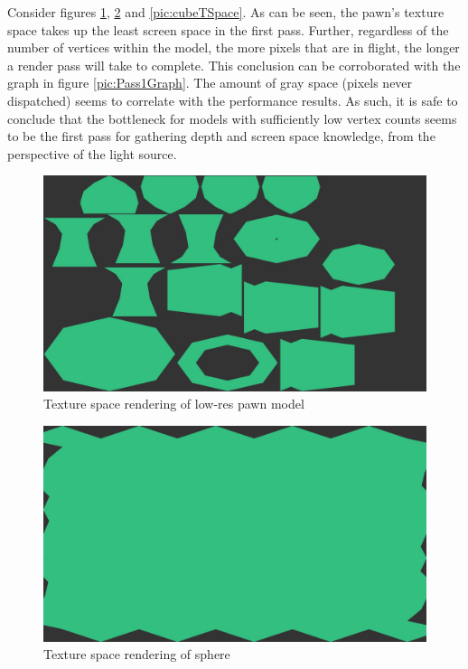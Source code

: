 \documentclass[a4paper, 12pt]{article}
\begin{document}
\noindent   Consider figures \ref{pic:pawnSpace}, \ref{pic:sphereSpace} and
\ref{pic:cubeTSpace}. As can be seen, the pawn's texture space takes up the
least screen space in the first pass. Further, regardless of the number of
vertices within the model, the more pixels that are in flight, the longer a
render pass will take to complete. This conclusion can be corroborated with
the graph in figure \ref{pic:Pass1Graph}. The amount of gray space (pixels
never dispatched) seems to correlate with the performance results. As such, it
is safe to conclude that the bottleneck for models with sufficiently low
vertex counts seems to be the first pass for gathering depth and screen space
knowledge, from the perspective of the light source.

\begin{figure}[!htb]
	\centering
	\includegraphics[width=1.0\textwidth]{pawnSpace2.jpg}
	\caption{Texture space rendering of low-res pawn model}
	\label{pic:pawnSpace}
\end{figure}

\begin{figure}[!htb]
	\centering
	\includegraphics[width=1.0\textwidth]{sphereSpace.jpg}
	\caption{Texture space rendering of sphere}
	\label{pic:sphereSpace}
\end{figure}
\end{document}
